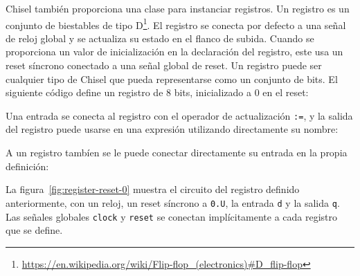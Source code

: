\documentclass[%
    10pt,
    headinclude, footinclude=false,
    openright, %
    notitlepage,
    cleardoublepage=empty,
    headsepline,
    numbers=noenddot,
    bibliography=totoc, index=totoc,
    ]{scrbook}
\newcommand{\scale}{0.7}
\newcommand{\code}[1]{{\lstinline[basicstyle=\small\ttfamily]{#1}}}
\newcommand{\myref}[2]{\href{#1}{#2}}
\renewcommand{\myref}[2]{{#2}{\footnote{\url{#1}}}}
\begin{document}
Chisel también proporciona una clase para instanciar registros. Un registro es un conjunto de
\myref{https://en.wikipedia.org/wiki/Flip-flop\_(electronics)\#D\_flip-flop}{biestables de tipo D}.
El registro se conecta por defecto a una señal de reloj global y se actualiza su estado en el flanco de subida.
Cuando se proporciona un valor de inicialización en la declaración del registro,
este usa un reset síncrono conectado a una señal global de reset.
Un registro puede ser cualquier tipo de Chisel que pueda representarse como un conjunto de bits.
El siguiente código define un registro de 8 bits, inicializado a 0 en el reset:



\noindent Una entrada se conecta al registro con el operador de actualización \code{:=}, y
la salida del registro puede usarse en una expresión utilizando directamente su nombre:



\noindent A un registro tambíen se le puede conectar directamente su entrada en la propia definición:



La figura~\ref{fig:register-reset-0} muestra el circuito del registro definido anteriormente, con
un reloj, un reset síncrono a \code{0.U}, la entrada \code{d} y la salida \code{q}.
Las señales globales \code{clock} y \code{reset} se conectan implícitamente a
cada registro que se define.

\end{document}
